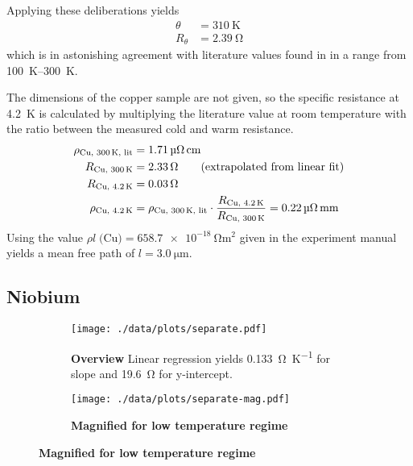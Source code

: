 Applying these deliberations yields
\begin{align*}
	\theta &= \SI{310}{\kelvin} \\
	R_\theta &= \SI{2.39}{\ohm}
\end{align*}
which is in astonishing agreement with literature values found in \cite{debyecu} in a range from \SIrange{100}{300}{\kelvin}.

The dimensions of the copper sample are not given, so the specific resistance at \SI{4.2}{\kelvin} is calculated by multiplying the literature value at room temperature with the ratio between the measured cold and warm resistance.
\begin{alignat*}{1}
	\rho_\text{Cu, \SI{300}{\kelvin}, lit} &= \SI{1.71}{\micro\ohm\centi\meter}\\
	R_\text{Cu, \SI{300}{\kelvin}} &= \SI{2.33}{\ohm} \tag{extrapolated from linear fit}\\
	R_\text{Cu, \SI{4.2}{\kelvin}} &= \SI{0.03}{\ohm}\\
	\rho_\text{Cu, \SI{4.2}{\kelvin}} &= \rho_\text{Cu, \SI{300}{\kelvin}, lit} \cdot \frac{R_\text{Cu, \SI{4.2}{\kelvin}}}{R_\text{Cu, \SI{300}{\kelvin}}} = \SI{0.22}{\micro\ohm\milli\meter}
\end{alignat*}
Using the value $\rho l \; \text{(Cu)} = \SI{658.7e-18}{\ohm\meter\squared}$ given in the experiment manual yields a mean free path of $l = \SI{3.0}{\micro\meter}$.

\subsection{Niobium}
\begin{figure}
\begin{adjustwidth}{-1cm}{-1cm}
	\centering
	\begin{subfigure}{.55\textwidth}
		\centering
		\texttt{[image: ./data/plots/separate.pdf]}
		\caption{\textbf{Overview} Linear regression yields \SI{0.133}{\ohm\per\kelvin} for slope and \SI{19.6}{\ohm} for y-intercept.}
	\end{subfigure}
	\hfill
	\begin{subfigure}{.55\textwidth}
		\centering
		\texttt{[image: ./data/plots/separate-mag.pdf]}
		\caption{\textbf{Magnified for low temperature regime}}
	\end{subfigure}
	\label{fig:niob}
\end{adjustwidth}
\end{figure}

